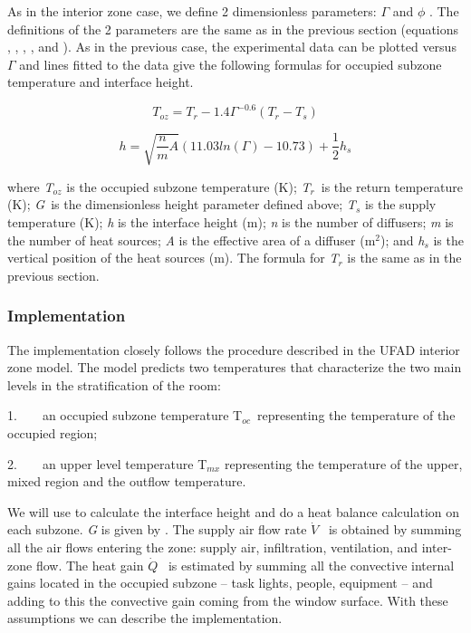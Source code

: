 As in the interior zone case, we define 2 dimensionless parameters: \(\Gamma\) and \(\phi\) . The definitions of the 2 parameters are the same as in the previous section (equations , , , , and ). As in the previous case, the experimental data can be plotted versus \(\Gamma\) and lines fitted to the data give the following formulas for occupied subzone temperature and interface height.

\begin{equation}
{T_{oz}} = {T_r} - 1.4{\Gamma ^{ - 0.6}}({T_r} - {T_s})
\end{equation}

\begin{equation}
h = \sqrt {\frac{n}{m}A} (11.03ln(\Gamma ) - 10.73) + \frac{1}{2}{h_s}
\end{equation}

where \emph{T\(_{oz}\)} is the occupied subzone temperature (K); \emph{T\(_{r}\)}~is the return temperature (K); \emph{G}~is the dimensionless height parameter defined above; \emph{T\(_{s}\)} is the supply temperature (K); \emph{h} is the interface height (m); \emph{n} is the number of diffusers; \emph{m} is the number of heat sources; \emph{A} is the effective area of a diffuser (m\(^{2}\)); and \emph{h\(_{s}\)} is the vertical position of the heat sources (m). The formula for \emph{T\(_{r}\)} is the same as in the previous section.

\subsubsection{Implementation}\label{implementation-2}

The implementation closely follows the procedure described in the UFAD interior zone model. The model predicts two temperatures that characterize the two main levels in the stratification of the room:

1.~~~~an occupied subzone temperature T\(_{oc}\)~representing the temperature of the occupied region;

2.~~~~an upper level temperature T\(_{mx}\) representing the temperature of the upper, mixed region and the outflow temperature.

We will use to calculate the interface height and do a heat balance calculation on each subzone. \emph{G} is given by . The supply air flow rate \(\dot V\) ~is obtained by summing all the air flows entering the zone: supply air, infiltration, ventilation, and inter-zone flow. The heat gain \(\dot Q\) ~is estimated by summing all the convective internal gains located in the occupied subzone -- task lights, people, equipment -- and adding to this the convective gain coming from the window surface. With these assumptions we can describe the implementation.

